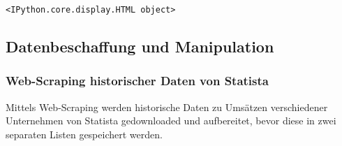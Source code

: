 \documentclass[paper=landscape]{scrartcl}
\begin{document}
    
    \begin{verbatim}
<IPython.core.display.HTML object>
    \end{verbatim}

    
    \hypertarget{datenbeschaffung-und-manipulation}{%
\subsection{Datenbeschaffung und
Manipulation}\label{datenbeschaffung-und-manipulation}}

\hypertarget{web-scraping-historischer-daten-von-statista}{%
\subsubsection{Web-Scraping historischer Daten von
Statista}\label{web-scraping-historischer-daten-von-statista}}

Mittels Web-Scraping werden historische Daten zu Umsätzen verschiedener
Unternehmen von Statista gedownloaded und aufbereitet, bevor diese in
zwei separaten Listen gespeichert werden.
\end{document}
